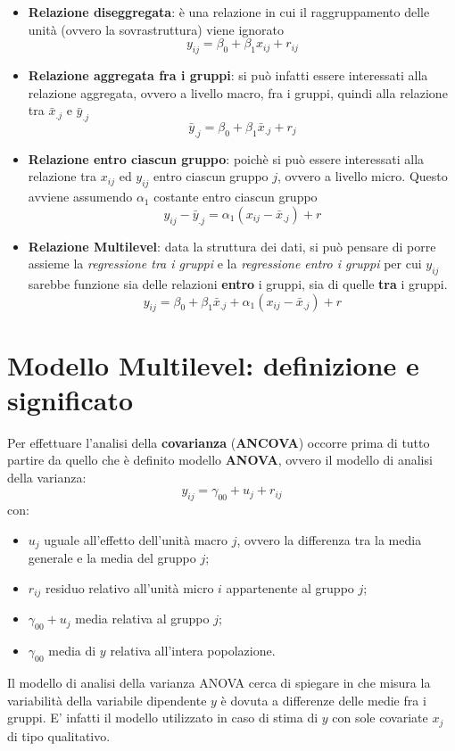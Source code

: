 \documentclass[a4page, 11pt]{article} %
\begin{document}
\begin{itemize}
\item \textbf{Relazione diseggregata}: è una relazione in cui il raggruppamento delle unità (ovvero la sovrastruttura) viene ignorato
\begin{equation*}
y_{ij} = \beta_0 + \beta_1 x_{ij} +r_{ij} 
\end{equation*}
\item \textbf{Relazione aggregata fra i gruppi}: si può infatti essere interessati alla relazione aggregata, ovvero a livello macro, fra i gruppi, quindi alla relazione tra $\bar{x}_{.j}$ e $\bar{y}_{.j}$
\begin{equation*}
\bar{y}_{.j} = \beta_0 + \beta_1 \bar{x}_{.j} + r_j
\end{equation*}
\item \textbf{Relazione entro ciascun gruppo}: poichè si può essere interessati alla relazione tra $x_{ij}$ ed $y_{ij}$ entro ciascun gruppo $j$, ovvero a livello micro. Questo avviene assumendo $\alpha_1$ costante entro ciascun gruppo
\begin{equation*}
y_{ij} - \bar{y}_{.j} = \alpha_1(x_{ij} - \bar{x}_{.j}) + r
\end{equation*}
\item \textbf{Relazione Multilevel}: data la struttura dei dati, si può pensare di porre assieme la \textit{regressione tra i gruppi} e la \textit{regressione entro i gruppi} per cui $y_{ij}$ sarebbe funzione sia delle relazioni \textbf{entro} i gruppi, sia di quelle \textbf{tra} i gruppi.
\begin{equation*}
y_{ij} = \beta_0 + \beta_1 \bar{x}_{.j} +\alpha_1(x_{ij} - \bar{x}_{.j}) + r
\end{equation*} 
\end{itemize}

\section{Modello Multilevel: definizione e significato}
Per effettuare l'analisi della \textbf{covarianza} (\textbf{ANCOVA}) occorre prima di tutto partire da quello che è definito modello \textbf{ANOVA}, ovvero il modello di analisi della varianza:
\begin{equation*}
y_{ij} = \gamma_{00} + u_j +r_{ij}
\end{equation*}
con:
\begin{itemize}
\item $u_j$ uguale all'effetto dell'unità macro $j$, ovvero la differenza tra la media generale e la media del gruppo $j$;
\item $r_{ij}$ residuo relativo all'unità micro $i$ appartenente al gruppo $j$;
\item $\gamma_{00}+u_j$ media relativa al gruppo $j$;
\item $\gamma_{00}$ media di $y$ relativa all'intera popolazione.
\end{itemize}
Il modello di analisi della varianza ANOVA cerca di spiegare in che misura la variabilità della variabile dipendente $y$ è dovuta a differenze delle medie fra i gruppi. E' infatti il modello utilizzato in caso di stima di $y$ con sole covariate $x_j$ di tipo qualitativo.
\end{document}
